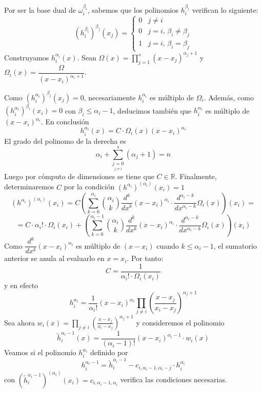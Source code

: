         \begin{dem}
        Por ser la base dual de $\omega_i^{\beta_i}$, sabemos que los polinomios $h_i^{\beta_i}$ verifican lo siguiente:
        $$(h_i^{\beta_i})^{\beta_j}(x_j)=\left\{\begin{array}{cc}
           0  & j\neq i \\
            0 & j=i, \,\beta_i\neq \beta_j\\
            1 & j=i,\, \beta_i=\beta_j
        \end{array}\right.$$
        Construyamos $h_i^{\alpha_i}(x)$. Sean $\Omega(x)=\prod_{j=1}^s(x-x_j)^{\alpha_j+1}$ y $\Omega_i(x)=\dfrac{\Omega}{(x-x_i)^{\alpha_i+1}}$. 
        
        Como $(h_i^{\alpha_i})^{\beta_j}(x_j)=0$, necesariamente $h_i^{\alpha_i}$ es múltiplo de $\Omega_i$. Además, como \newline $(h_i^{\alpha_i})^{\beta_i}(x_i)=0$ con $\beta_i\leq\alpha_i-1$, deducimos también que $h_i^{\alpha_i}$ es múltiplo de $(x-x_i)^{\alpha_i}$. En conclusión
        $$h_i^{\alpha_i}(x)=C \cdot\Omega_i(x)(x-x_i)^{\alpha_i}$$
        El grado del polinomo de la derecha es
        $$\alpha_i+\sum_{\underset{j\neq i}{j=0}}^s(\alpha_j+1)=n$$
        Luego por cómputo de dimensiones se tiene que $C\in \mathbb{R}$.      Finalmente, determinaremos $C$ por la condición $(h^{\alpha_i})^{(\alpha_i)}(x_i)=1$
        $$(h^{\alpha_i})^{(\alpha_i)}(x_i)= C\left(\sum_{k=0}^{\alpha_i}\binom{\alpha_i}{k}\dfrac{d^k}{dx^k}(x-x_i)^{\alpha_i}\cdot\dfrac{d^{\alpha_i-k}}{dx^{\alpha_i-k}}\Omega_i(x)\right)(x_i)= $$
        $$=C\cdot \alpha_i!\cdot \Omega_i(x_i)+\left(\sum_{k=0}^{\alpha_i-1}\binom{\alpha_i}{k}\dfrac{d^k}{dx^k}(x-x_i)^{\alpha_i}\cdot\dfrac{d^{\alpha_i-k}}{dx^{\alpha_i-k}}\Omega_i(x)\right)(x_i)$$
        Como $\dfrac{d^k}{dx^k}(x-x_i)^{\alpha_i}$ es múltiplo de $(x-x_i)$ cuando $k\leq \alpha_i-1$, el sumatorio anterior se anula al evaluarlo en $x=x_i$. Por tanto:
        $$C=\dfrac{1}{\alpha_i!\cdot \Omega_i(x_i)}$$
        y en efecto 
        $$h_i^{\alpha_i}=\frac{1}{\alpha_i!}(x-x_i)^{\alpha_i}\prod_{j\neq i}\left(\frac{x-x_j}{x_i-x_j}\right)^{\alpha_j+1}$$
Sea ahora $w_i(x)=\prod_{j\neq i}\left(\frac{x-x_j}{x_i-x_j}\right)^{\alpha_j+1}$ y consideremos el polinomio
$$\tilde{h}_i^{\alpha_i-1}(x)=\dfrac{1}{(\alpha_i-1)!}(x-x_i)^{\alpha_i-1}\cdot w_i(x)$$
Veamos si el polinomio $h_i^{\alpha_i}$ definido por
$$h_i^{\alpha_i-1}=\tilde{h}_i^{\alpha_i-1}-c_{i,\alpha_i-1,\alpha_i-j}\cdot h_i^{\alpha_i}$$
con $(\tilde{h}_i^{\alpha_i-1})^{(\alpha_i)}(x_i)=
c_{i,\alpha_i-1,\alpha_i}$ verifica las condiciones necesarias. 


\end{dem}
